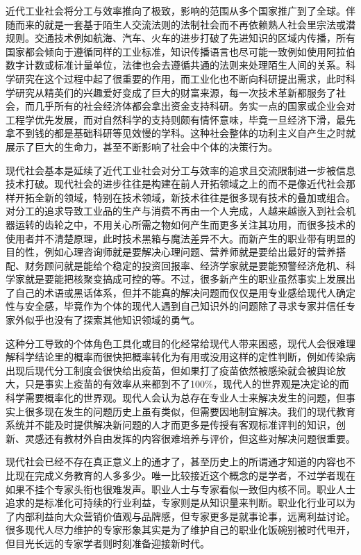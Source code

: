 \documentclass[]{tufte-book}
\begin{document}
近代工业社会将分工与效率推向了极致，影响的范围从多个国家推广到了全球。伴随而来的就是一套基于陌生人交流法则的法制社会而不再依赖熟人社会里宗法或潜规则。交通技术例如航海、汽车、火车的进步打破了先进知识的区域内传播，所有国家都会倾向于遵循同样的工业标准，知识传播语言也尽可能一致例如使用阿拉伯数字计数或标准计量单位，法律也会去遵循共通的法则来处理陌生人间的关系。科学研究在这个过程中起了很重要的作用，而工业化也不断向科研提出需求，此时科学研究从精英们的兴趣爱好变成了巨大的财富来源，每一次技术革新都服务了社会，而几乎所有的社会经济体都会拿出资金支持科研。务实一点的国家或企业会对工程学优先发展，而对自然科学的支持则颇有情怀意味，毕竟一旦经济下滑，最先拿不到钱的都是基础科研等见效慢的学科。这种社会整体的功利主义自产生之时就展示了巨大的生命力，甚至不断影响了社会中个体的决策行为。

现代社会基本是延续了近代工业社会对分工与效率的追求且交流限制进一步被信息技术打破。现代社会的进步往往是构建在前人开拓领域之上的而不是像近代社会那样开拓全新的领域，特别在技术领域，新技术往往是很多现有技术的叠加或组合。对分工的追求导致工业品的生产与消费不再由一个人完成，人越来越嵌入到社会机器运转的齿轮之中，不用关心所需之物如何产生而更多关注其功用，而很多技术的使用者并不清楚原理，此时技术黑箱与魔法差异不大。而新产生的职业带有明显的目的性，例如心理咨询师就是要解决心理问题、营养师就是要给出最好的营养搭配、财务顾问就是能给个稳定的投资回报率、经济学家就是要能预警经济危机、科学家就是要能把核聚变搞成可控的等。不过，很多新产生的职业虽然事实上发展出了自己的术语或黑话体系，但并不能真的解决问题而仅仅是用专业感给现代人确定性与安全感，毕竟作为个体的现代人遇到自己知识外的问题除了寻求专家并信任专家外似乎也没有了探索其他知识领域的勇气。

这种分工导致的个体角色工具化或目的化经常给现代人带来困惑，现代人会很难理解科学结论里的概率而很快把概率转化为有用或没用这样的定性判断，例如传染病出现后现代分工制度会很快给出疫苗，但如果打了疫苗依然被感染就会被舆论放大，只是事实上疫苗的有效率从来都到不了100\%，现代人的世界观是决定论的而科学需要概率化的世界观。现代人会认为总存在专业人士来解决发生的问题，但事实上很多现在发生的问题历史上虽有类似，但需要因地制宜解决。我们的现代教育系统并不能及时提供解决新问题的人才而更多是传授有客观标准评判的知识，创新、灵感还有教材外自由发挥的内容很难培养与评价，但这些对解决问题很重要。

现代社会已经不存在真正意义上的通才了，甚至历史上的所谓通才知道的内容也不比现在完成义务教育的人多多少。唯一比较接近这个概念的是学者，不过学者现在如果不挂个专家头衔也很难发声。职业人士与专家看似一致但内核不同。职业人士追求的是标准化可持续的行业利益，专家则是从知识量来判断。职业化行业可以为了内部利益向大众营销价值观与品牌感，但专家更多是就事论事，远离利益讨论。很多现代人尽力维护的专家形象其实是为了维护自己的职业化饭碗别被时代甩开，但目光长远的专家学者则时刻准备迎接新时代。
\end{document}
